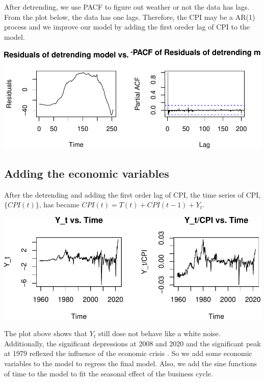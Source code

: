 \documentclass[
  man,floatsintext,
  man]{apa6}
\begin{document}
After detrending, we use PACF to figure out weather or not the data has lags.
From the plot below, the data has one lags.
Therefore, the CPI may be a AR(1) process
and we improve our model by adding the first oreder lag of CPI to the model.

\includegraphics{stat429_group2_final_proj_files/figure-latex/unnamed-chunk-2-1.pdf}

\subsection{Adding the economic variables}\label{adding-the-economic-variables}

After the detrending and adding the first order lag of CPI, the time series of CPI, \(\{CPI(t)\}\), has became \(CPI(t) = T(t) + CPI(t-1) + Y_t\).

\includegraphics{stat429_group2_final_proj_files/figure-latex/unnamed-chunk-3-1.pdf}

The plot above shows that \(Y_t\) still dose not behave like a white noise.
Additionally, the significant depressions at 2008 and 2020 and the significant peak at 1979 reflexed the influence of the economic crisis\autocite{gross2019iran} \autocite{williams2010uncontrolled} \autocite{forbes_2019_strange_new_world}.
So we add some economic variables to the model to regress the final model.
Also, we add the sine functions of time to the model to fit the seasonal effect of the business cycle.
\end{document}
